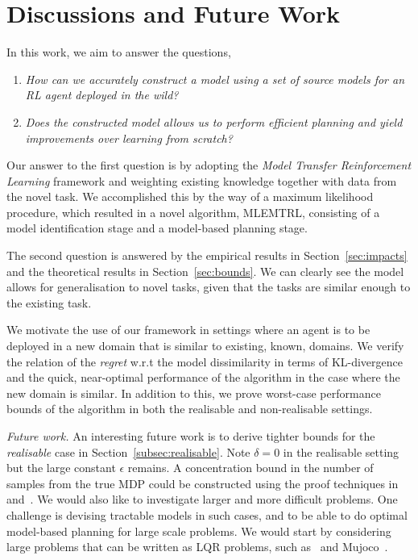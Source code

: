\section{Discussions and Future Work}\label{sec:discussion}
In this work, we aim to answer the questions,
\begin{enumerate}
    \item \emph{How can we accurately construct a model using a set of source models for an RL agent deployed in the wild?}
    \item \emph{Does the constructed model allows us to perform efficient planning and yield improvements over learning from scratch?}
\end{enumerate}
Our answer to the first question is by adopting the \emph{Model Transfer Reinforcement Learning} framework and weighting existing knowledge together with data from the novel task. We accomplished this by the way of a maximum likelihood procedure, which resulted in a novel algorithm, MLEMTRL, consisting of a model identification stage and a model-based planning stage. 

The second question is answered by the empirical results in Section~\ref{sec:impacts} and the theoretical results in Section~\ref{sec:bounds}. We can clearly see the model allows for generalisation to novel tasks, given that the tasks are similar enough to the existing task. 

We motivate the use of our framework in settings where an agent is to be deployed in a new domain that is similar to existing, known, domains. We verify the relation of the \emph{regret} w.r.t the model dissimilarity in terms of KL-divergence and the quick, near-optimal performance of the algorithm in the case where the new domain is similar. In addition to this, we prove worst-case performance bounds of the algorithm in both the realisable and non-realisable settings. 


\textit{Future work.} An interesting future work is to derive tighter bounds for the \emph{realisable} case in Section~\ref{subsec:realisable}. Note $\delta=0$ in the realisable setting but the large constant $\epsilon$ remains. A concentration bound in the number of samples from the true MDP could be constructed using the proof techniques in~\citet{anastasiou2019normal} and~\citet{ouhamma2022bilinear}. We would also like to investigate larger and more difficult problems. One challenge is devising tractable models in such cases, and to be able to do optimal model-based planning for large scale problems. We would start by considering large problems that can be written as LQR problems, such as~\citep{tunyasuvunakool2020dm_control} and Mujoco~\citep{todorov2012mujoco}.